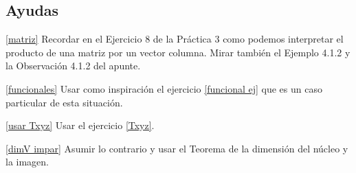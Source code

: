 \documentclass[12pt]{amsart}
\begin{document}
\subsection*{Ayudas}

\eqref{matriz} Recordar en el Ejercicio 8 de la Pr\'actica 3 como podemos interpretar el producto de una matriz por un vector columna. Mirar tambi\'en el Ejemplo 4.1.2 y la Observaci\'on 4.1.2 del apunte.

\eqref{funcionales} Usar como inspiraci\'on el ejercicio \eqref{funcional ej} que es un caso particular de esta situaci\'on.

\eqref{usar Txyz} Usar el ejercicio \eqref{Txyz}.

\eqref{dimV impar} Asumir lo contrario y usar el Teorema de la dimensi\'on del n\'ucleo y la imagen.





\end{document}
